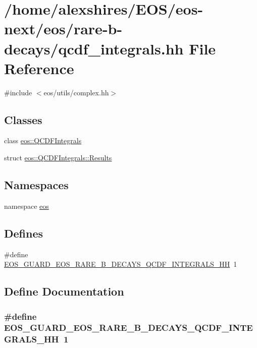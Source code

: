 \hypertarget{qcdf__integrals_8hh}{
\section{/home/alexshires/EOS/eos-\/next/eos/rare-\/b-\/decays/qcdf\_\-integrals.hh File Reference}
\label{qcdf__integrals_8hh}
}
{\ttfamily \#include $<$eos/utils/complex.hh$>$}\par
\subsection*{Classes}
\begin{DoxyCompactItemize}
\item 
class \hyperlink{classeos_1_1QCDFIntegrals}{eos::QCDFIntegrals}
\item 
struct \hyperlink{structeos_1_1QCDFIntegrals_1_1Results}{eos::QCDFIntegrals::Results}
\end{DoxyCompactItemize}
\subsection*{Namespaces}
\begin{DoxyCompactItemize}
\item 
namespace \hyperlink{namespaceeos}{eos}
\end{DoxyCompactItemize}
\subsection*{Defines}
\begin{DoxyCompactItemize}
\item 
\#define \hyperlink{qcdf__integrals_8hh_a22714b9eea2c1c4f506ea9b45a76f43a}{EOS\_\-GUARD\_\-EOS\_\-RARE\_\-B\_\-DECAYS\_\-QCDF\_\-INTEGRALS\_\-HH}~1
\end{DoxyCompactItemize}


\subsection{Define Documentation}
\hypertarget{qcdf__integrals_8hh_a22714b9eea2c1c4f506ea9b45a76f43a}{
\subsubsection[{EOS\_\-GUARD\_\-EOS\_\-RARE\_\-B\_\-DECAYS\_\-QCDF\_\-INTEGRALS\_\-HH}]{\setlength{\rightskip}{0pt plus 5cm}\#define EOS\_\-GUARD\_\-EOS\_\-RARE\_\-B\_\-DECAYS\_\-QCDF\_\-INTEGRALS\_\-HH~1}}
\label{qcdf__integrals_8hh_a22714b9eea2c1c4f506ea9b45a76f43a}
